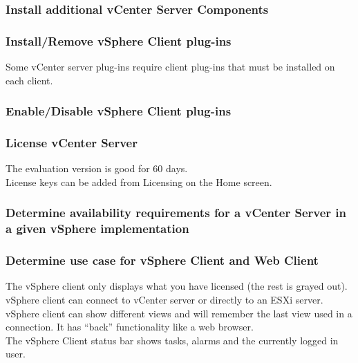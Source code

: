 \subsubsection{Install additional vCenter Server Components}

\subsubsection{Install/Remove vSphere Client plug-ins}

Some vCenter server plug-ins require client plug-ins that must be installed
on each client.

\subsubsection{Enable/Disable vSphere Client plug-ins}

\subsubsection{License vCenter Server}

The evaluation version is good for 60 days.\\

License keys can be added from Licensing on the Home screen.

\subsubsection{Determine availability requirements for a vCenter Server in a given vSphere implementation}

\subsubsection{Determine use case for vSphere Client and Web Client}

The vSphere client only displays what you have licensed (the rest is grayed
out).\\

vSphere client can connect to vCenter server or directly to an ESXi server.\\

vSphere client can show different views and will remember the last view used
in a connection. It has ``back'' functionality like a web browser.\\

The vSphere Client status bar shows tasks, alarms and the currently logged in
user.\\

